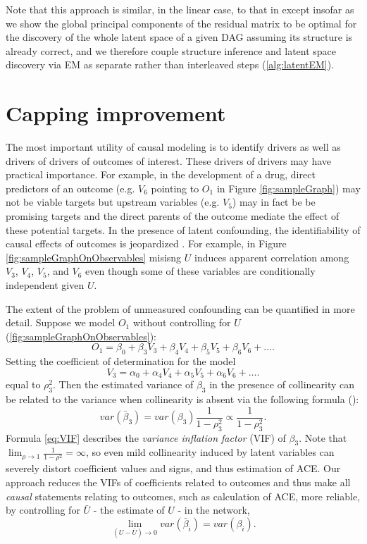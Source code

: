 \documentclass[letterpaper]{article}
\begin{document}
Note that this approach is similar, in the linear case, to that in \cite{elidan_ideal_2007} except insofar as we show the global principal components of the residual matrix to be optimal for the discovery of the whole latent space of a given DAG assuming its structure is already correct, and we therefore couple structure inference and latent space discovery via EM as separate rather than interleaved steps (\ref{alg:latentEM}).

\section{Capping improvement}

The most important utility of causal modeling is to identify drivers as well as drivers of drivers of outcomes of interest.  These drivers of drivers may have practical importance. For example, in the development of a drug, direct predictors of an outcome (e.g. $V_6$ pointing to $O_{1}$ in Figure \ref{fig:sampleGraph}) may not be viable targets but upstream variables (e.g. $V_{5}$) may in fact be be promising targets and the direct parents of the outcome mediate the effect of these potential targets. In the presence of latent confounding, the identifiability of causal effects of outcomes is jeopardized \cite{hernan_estimating_2006}.  For example, in Figure \ref{fig:sampleGraphOnObservables} misisng $U$ induces apparent correlation among $V_3$, $V_4$, $V_5$, and $V_6$ even though some of these variables are conditionally independent given $U$.  

The extent of the problem of unmeasured confounding can be quantified in more detail.  Suppose we model $O_1$ without controlling for $U$ (\ref{fig:sampleGraphOnObservables}): $$O_1 = \beta_0 + \beta_3 V_3 + \beta_4 V_4 + \beta_5 V_5 + \beta_6 V_6 + \dots.$$  Setting the coefficient of determination for the model $$V_3 = \alpha_0 + \alpha_4 V_4 + \alpha_5 V_5 + \alpha_6 V_6 + \dots.$$ equal to $\rho_3^2$.  Then the estimated variance of $\beta_3$ in the presence of collinearity can be related to the variance when collinearity is absent via the following formula (\cite{rawlings_applied_1998}):
\begin{equation}
var(\bar{\beta}_3) = var(\beta_3) \frac{1}{1-\rho_3^2} \propto \frac{1}{1-\rho_3^2}.
\label{eq:VIF}
\end{equation}
Formula \ref{eq:VIF} describes the \textit{variance inflation factor} (VIF) of $\beta_3$.  Note that $\lim_{\rho \to 1} \frac{1}{1-\rho^2} = \infty$, so even mild collinearity induced by latent variables can severely distort coefficient values and signs, and thus estimation of ACE.  Our approach reduces the VIFs of coefficients related to outcomes and thus make all \textit{causal} statements relating to outcomes, such as calculation of ACE, more reliable, by controlling for $\bar{U}$ - the estimate of $U$ - in the network,
\begin{equation}
\lim_{(U - \bar{U})\to0} var(\bar{\beta}_i) = var(\beta_i).
\label{eq:vifImprovement}
\end{equation}
\end{document}

